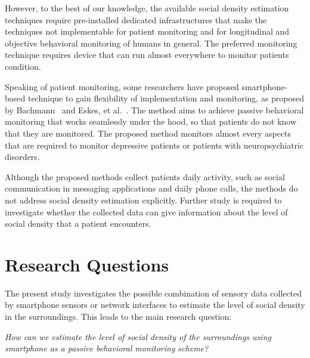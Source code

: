 However, to the best of our knowledge, the available social density estimation techniques require pre-installed dedicated infrastructures that make the techniques not implementable for patient monitoring and
for longitudinal and objective behavioral monitoring of humans in general.
The preferred monitoring technique requires device that can run almost everywhere to monitor patients condition.

Speaking of patient monitoring, some researchers have proposed smartphone-based technique to gain flexibility of implementation and monitoring, as proposed by Bachmann~\cite{thesis031} and Eskes, et al.~\cite{thesis015}. The method aims to achieve passive behavioral monitoring that works seamlessly under the hood, so that patients do not know that they are monitored. The proposed method monitors almost every aspects that are required to monitor depressive patients or patients with neuropsychiatric disorders.

Although the proposed methods collect patients daily activity, such as social communication in messaging applications and daily phone calls, the methods do not address social density estimation explicitly. Further study is required to investigate whether the collected data can give information about the level of social density that a patient encounters. 

\section{Research Questions} %
\label{sec:research_questions}
The present study investigates the possible combination of sensory data collected by smartphone sensors or network interfaces to estimate the level of social density in the surroundings. 
This leads to the main research question:
\begin{displayquote}\textit{
How can we estimate the level of social density of the surroundings using smartphone as a passive behavioral monitoring scheme?}
\end{displayquote}

